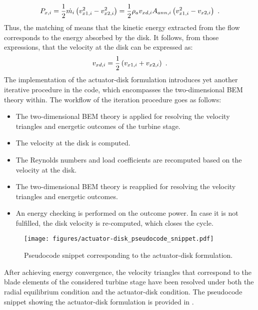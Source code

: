 \begin{equation}{\label{eq:energy_conservation_lost_power}}
	P_{x,i}=\frac{1}{2}\dot{m_{i}}\left(v_{x1,i}^{2}-v_{x2,i}^{2}\right)=\frac{1}{2}\rho_{a}v_{xd,i}A_{ann,i}\left(v_{x1,i}^{2}-v_{x2,i}\right) \ .
\end{equation}
Thus, the matching of  means that the kinetic energy extracted from the flow corresponds to the energy absorbed by the disk. It follows, from those expressions, that the velocity at the disk can be expressed as:
\begin{equation}{\label{eq:disk_velocity}}
	v_{xd,i}=\frac{1}{2}\left(v_{x1,i}+v_{x2,i}\right) \ .
\end{equation}
The implementation of the actuator-disk formulation introduces yet another iterative procedure in the code, which encompasses the two-dimensional BEM theory within. The workflow of the iteration procedure goes as follows:
\begin{itemize}
	\item{The two-dimensional BEM theory is applied for resolving the velocity triangles and energetic outcomes of the turbine stage.}
	\item{The velocity at the disk is computed.}
	\item{The Reynolds numbers and load coefficients are recomputed based on the velocity at the disk.}
	\item{The two-dimensional BEM theory is reapplied for resolving the velocity triangles and energetic outcomes.}
	\item{An energy checking is performed on the outcome power. In case it is not fulfilled, the disk velocity is re-computed, which closes the cycle.}
\end{itemize}
\begin{figure}[t!]
	\texttt{[image: figures/actuator-disk\_pseudocode\_snippet.pdf]}
	\caption{Pseudocode snippet corresponding to the actuator-disk formulation.}
	\label{fig:actuator-disk_pseudocode_snippet}
\end{figure}
After achieving energy convergence, the velocity triangles that correspond to the blade elements of the considered turbine stage have been resolved under both the radial equilibrium condition and the actuator-disk condition. The pseudocode snippet showing the actuator-disk formulation is provided in .
